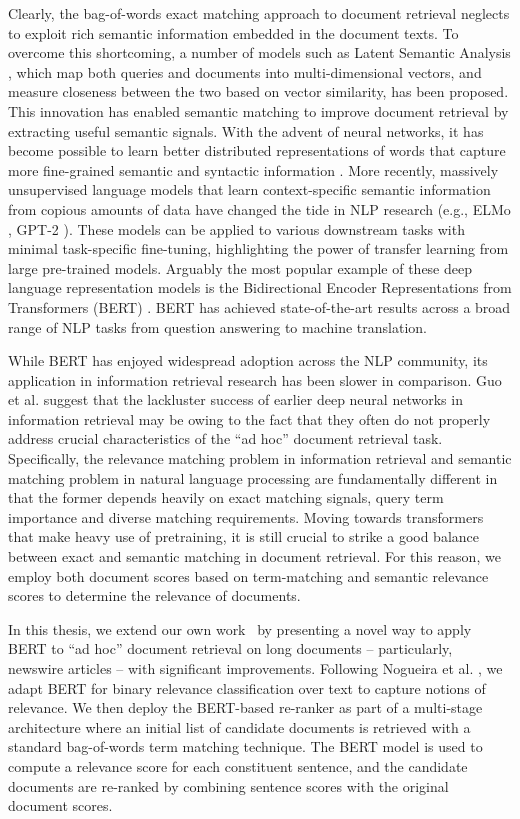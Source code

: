 Clearly, the bag-of-words exact matching approach to document retrieval neglects to exploit rich semantic information embedded in the document texts.
To overcome this shortcoming, a number of models such as Latent Semantic Analysis \cite{deerwester1990indexing}, which map both queries and documents into multi-dimensional vectors, and measure closeness between the two based on vector similarity, has been proposed.
This innovation has enabled semantic matching to improve document retrieval by extracting useful semantic signals.
With the advent of neural networks, it has become possible to learn better distributed representations of words that capture more fine-grained semantic and syntactic information \cite{mikolov2013distributed, pennington2014glove}.
More recently, massively unsupervised language models that learn context-specific semantic information from copious amounts of data have changed the tide in NLP research (e.g., ELMo \cite{peters2018deep}, GPT-2 \cite{radford2019language}).
These models can be applied to various downstream tasks with minimal task-specific fine-tuning, highlighting the power of transfer learning from large pre-trained models.
Arguably the most popular example of these deep language representation models is the Bidirectional Encoder Representations from Transformers (BERT) \cite{devlin2018bert}.
BERT has achieved state-of-the-art results across a broad range of NLP tasks from question answering to machine translation.

While BERT has enjoyed widespread adoption across the NLP community, its application in information retrieval research has been slower in comparison.
Guo et al. \cite{guo2016deep} suggest that the lackluster success of earlier deep neural networks in information retrieval may be owing to the fact that they often do not properly address crucial characteristics of the ``ad hoc'' document retrieval task.
Specifically, the relevance matching problem in information retrieval and semantic matching problem in natural language processing are fundamentally different in that the former depends heavily on exact matching signals, query term importance and diverse matching requirements.
Moving towards transformers that make heavy use of pretraining, it is still crucial to strike a good balance between exact and semantic matching in document retrieval.
For this reason, we employ both document scores based on term-matching and semantic relevance scores to determine the relevance of documents.

In this thesis, we extend our own work~\cite{yilmaz2019cross, yilmaz2019applying} by presenting a novel way to apply BERT to ``ad hoc'' document retrieval on long documents -- particularly, newswire articles -- with significant improvements.
Following Nogueira et al. \cite{nogueira2019passage}, we adapt BERT for binary relevance classification over text to capture notions of relevance.
We then deploy the BERT-based re-ranker as part of a multi-stage architecture where an initial list of candidate documents is retrieved with a standard bag-of-words term matching technique.
The BERT model is used to compute a relevance score for each constituent sentence, and the candidate documents are re-ranked by combining sentence scores with the original document scores.

